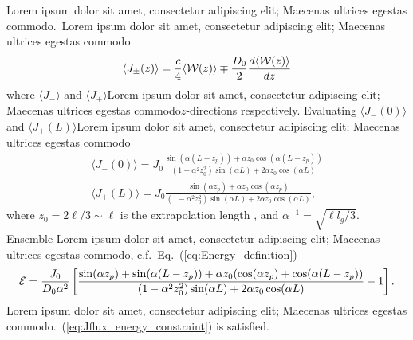 Lorem ipsum dolor sit amet, consectetur adipiscing elit; Maecenas ultrices egestas commodo.~\cite{1993_Lisyansky_diffusint,1999_van_Rossum}Lorem ipsum dolor sit amet, consectetur adipiscing elit; Maecenas ultrices egestas commodo\cite{1953_Morse}
\begin{equation}
\langle J_{\pm}(z)\rangle = \frac{c}{4} \langle {\cal W}(z)\rangle \mp \frac{D_0}{2} \frac{d\langle {\cal W}(z)\rangle }{dz}
\label{eq:diffusive_flux}
\end{equation}
where $ \langle J_{-}\rangle$ and $ \langle J_{+}\rangle $Lorem ipsum dolor sit amet, consectetur adipiscing elit; Maecenas ultrices egestas commodo$z$-directions respectively. Evaluating $\langle J_{-}(0)\rangle$ and $\langle J_{+}(L)\rangle$Lorem ipsum dolor sit amet, consectetur adipiscing elit; Maecenas ultrices egestas commodo
\begin{eqnarray}
\langle J_- (0)\rangle  = J_0 \frac{\sin(\alpha  (L-z _p)) + \alpha z_0 \cos(\alpha (L-z _p))}{(1-\alpha ^2 z_0 ^2) \sin(\alpha L) + 2 \alpha z_0 \cos(\alpha L)}
\label{eq:Jreflectionflux} \\
\langle J_+ (L)\rangle  = J_0 \frac{\sin(\alpha z_p) + \alpha z _0 \cos(\alpha z_p)}{(1-\alpha^2 z_0^2) \sin(\alpha L) + 2 \alpha z_0 \cos(\alpha L)},
\label{eq:Jtransmissionflux}
\end{eqnarray}
where $z_0=2\ell/3\sim\ell$ is the extrapolation length \cite{1991_zhu_z0}, and $\alpha^{-1}=\sqrt{\ell l_g/3}$. Ensemble-Lorem ipsum dolor sit amet, consectetur adipiscing elit; Maecenas ultrices egestas commodo, c.f.~Eq.~(\ref{eq:Energy_definition})
\begin{equation}
{\cal E}=
\frac{J_0}{D_0 \alpha ^2} \left[\frac
{\sin(\alpha z_p) + \sin(\alpha (L-z_p))+\alpha z_0 (\cos(\alpha z_p) + \cos(\alpha (L-z_p))}
{(1-\alpha^2 z_0^2)\sin(\alpha L)+2\alpha z_0\cos(\alpha L)}-1\right].
\label{eq:diffusive_energy}
\end{equation}
Lorem ipsum dolor sit amet, consectetur adipiscing elit; Maecenas ultrices egestas commodo.~(\ref{eq:Jflux_energy_constraint}) is satisfied.

